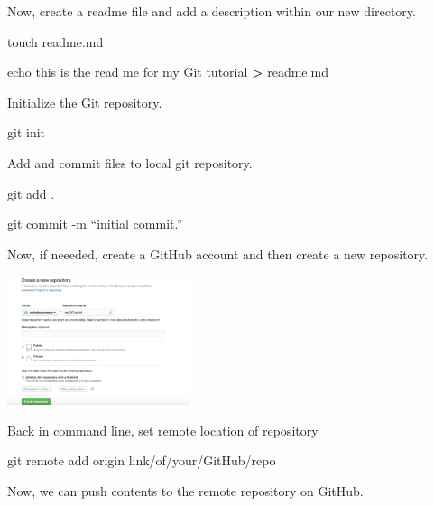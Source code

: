 \documentclass[]{book}
\newenvironment{Shaded}{\begin{snugshade}}{\end{snugshade}}
\newcommand{\FunctionTok}[1]{\textcolor[rgb]{0.00,0.00,0.00}{#1}}
\newcommand{\OperatorTok}[1]{\textcolor[rgb]{0.81,0.36,0.00}{\textbf{#1}}}
\newcommand{\BuiltInTok}[1]{#1}
\newcommand{\NormalTok}[1]{#1}
\begin{document}
Now, create a readme file and add a description within our new
directory.

\begin{Shaded}
\begin{Highlighting}[]
\FunctionTok{touch}\NormalTok{ readme.md}

\BuiltInTok{echo}\NormalTok{ this is the read me for my Git tutorial }\OperatorTok{>}\NormalTok{ readme.md}
\end{Highlighting}
\end{Shaded}

Initialize the Git repository.

\begin{Shaded}
\begin{Highlighting}[]
\FunctionTok{git}\NormalTok{ init}
\end{Highlighting}
\end{Shaded}

Add and commit files to local git repository.

\begin{Shaded}
\begin{Highlighting}[]
\FunctionTok{git}\NormalTok{ add .}

\FunctionTok{git}\NormalTok{ commit -m “initial commit.”}
\end{Highlighting}
\end{Shaded}

Now, if neeeded, create a GitHub account and then create a new
repository.

\includegraphics[width=0.40000\textwidth]{images/create new git repo.png}

Back in command line, set remote location of repository

\begin{Shaded}
\begin{Highlighting}[]
\FunctionTok{git}\NormalTok{ remote add origin link/of/your/GitHub/repo}
\end{Highlighting}
\end{Shaded}

Now, we can push contents to the remote repository on GitHub.
\end{document}
